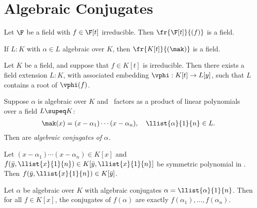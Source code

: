 \documentclass[a4paper]{article}
\begin{document}
\section{Algebraic Conjugates}

\begin{tlemma}
  Let \( \F \) be a field with \( f\in \F[t] \) irreducible.
  Then \( \fr{\F[t]}{(f)} \) is a field.
\end{tlemma}

\begin{tcorollary}
  If \( L:K \) with \( \alpha\in L \) algebraic over \( K \), then \( \fr{K[t]}{(\mak)} \) is a field.
\end{tcorollary}

\begin{ttheorem}
  Let \( K \) be a field, and suppose that \( f\in K[t] \) is irreducible.
  Then there exists a field extension \( L:K \), with associated embedding \( \vphi:K[t]\to L[y] \), such that \( L \) contains a root of \( \vphi(f) \).
\end{ttheorem}

\begin{tdefinition}
  Suppose \( \alpha \) is algebraic over \( K \) and \mak~factors as a product of linear polynomials over a field \( L\supeq K \): \begin{align*}
    \mak(x) = (x-\alpha_1)\cdots(x-\alpha_n),\quad \llist{\alpha}{1}{n}\in L.
  \end{align*}
  Then  are \it{algebraic conjugates} of \( \alpha \).
\end{tdefinition}

\begin{tlemma}
  Let \( (x-\alpha_1)\cdots(x-\alpha_n)\in K[x] \) and \( f(\bar y,\llist{x}{1}{n})\in K[\bar y,\llist{x}{1}{n}] \) be symmetric polynomial in .
  Then \( f(\bar y,\llist{x}{1}{n}) \in K[\bar y] \).
\end{tlemma}

\begin{ttheorem}
  Let \( \alpha \) be algebraic over \( K \) with algebraic conjugates \( \alpha=\llist{\alpha}{1}{n} \).
  Then for all \( f\in K[x] \), the conjugates of \( f(\alpha) \) are exactly \( f(\alpha_1),\ldots,f(\alpha_n) \).
\end{ttheorem}
\end{document}
